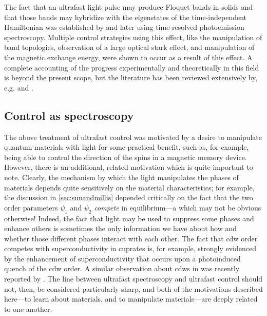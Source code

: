 The fact that an ultrafast light pulse may produce Floquet bands in solids and that those bands may hybridize with the eigenstates of the time-independent Hamiltonian was established by \citet{wang_observation_2013} and later \citet{mahmood_selective_2016} using time-resolved photoemission spectroscopy.
Multiple control strategies using this effect, like the manipulation of band topologies\citep{mciver_light-induced_2020}, observation of a large optical stark effect\citep{sie_valley-selective_2015}, and manipulation of the magnetic exchange energy\citep{batignani_probing_2015}, were shown to occur as a result of this effect.
A complete accounting of the progress experimentally and theoretically in this field is beyond the present scope, but the literature has been reviewed extensively by, e.g. \citet{torre_colloquium_2021} and \citet{oka_floquet_2019}.

\subsection{Control as spectroscopy}

The above treatment of ultrafast control was motivated by a desire to manipulate quantum materials with light for some practical benefit, such as, for example, being able to control the direction of the spins in a magnetic memory device.
However, there is an additional, related motivation which is quite important to note.
Clearly, the mechanism by which the light manipulates the phases of materials depends quite sensitively on the material characteristics; for example, the discussion in \cref{sec:sunandmillis} depended critically on the fact that the two order parameters $\psi_1$ and $\psi_2$ \emph{compete} in equilibrium---a which may not be obvious otherwise!
Indeed, the fact that light may be used to suppress some phases and enhance others is sometimes the only information we have about how and whether those different phases interact with each other.
The fact that \gls{cdw} order competes with superconductivity in cuprates is, for example, strongly evidenced by the enhancement of superconductivity that occurs upon a photoinduced quench of the \gls{cdw} order\citep{fausti_light-induced_2011}.
A similar observation about \glspl{cdw} in  was recently reported by \citet{ning_dynamical_2024}.
The line between ultrafast spectroscopy and ultrafast control should not, then, be considered particularly sharp, and both of the motivations described here---to learn about materials, and to manipulate materials---are deeply related to one another.
